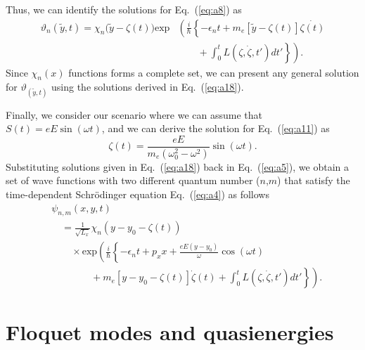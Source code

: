 \documentclass[
 reprint,
 amsmath,amssymb,
 aps,
 prb,
]{revtex4-2}
\begin{document}
Thus, we can identify the solutions for Eq.~(\ref{eq:a8}) as
\begin{equation} \label{eq:a18}
  \begin{aligned}
    \vartheta_n(\tilde{y},t) = \chi_n\bm{(}\tilde{y} - \zeta(t)\bm{)}
     \text{exp}&
     \left(
     \frac{i}{\hbar}
     \left\{
     - \epsilon_nt +
     m_e \left[\tilde{y}-\zeta(t)\right] \dot{\zeta(t)} \right. \right. \\
     & \left. \left. \qquad
     + \int_0^{t}L(\zeta,\dot{\zeta},t') dt'
     \right\}
     \right).
  \end{aligned}
\end{equation}
Since $\chi_n(x)$ functions forms a complete set, we can present any general solution for  $\vartheta_(\tilde{y},t)$ using the solutions derived in Eq.~(\ref{eq:a18}).

Finally, we consider our scenario where we can assume that $S(t) = eE\sin(\omega t)$, and we can derive the solution for Eq.~(\ref{eq:a11}) as
\begin{equation} \label{eq:a19}
  \zeta(t) = \frac{eE}{m_e(\omega_0^2 - \omega^2)}\sin(\omega t).
\end{equation}
Substituting solutions given in Eq.~(\ref{eq:a18}) back in Eq.~(\ref{eq:a5}), we obtain a set of wave functions with two different quantum number ($n$,$m$) that satisfy the time-dependent Schrödinger equation Eq.~(\ref{eq:a4}) as follows
\begin{equation} \label{eq:a20}
  \begin{aligned}
    &\psi_{n,m}(x,y,t) \\
    & \quad=  \frac{1}{\sqrt{L_x}}
    \chi_n\left(y - y_0 - \zeta(t)\right)\\
    &\qquad\times
    \text{exp}\left(
    \frac{i}{\hbar}
    \left\{- \epsilon_nt
    + p_x x
    + \frac{eE(y - y_0)}{\omega}\cos(\omega t) \right. \right. \\
    & \left. \left. \qquad\qquad +
    m_e\left[y - y_0 -\zeta(t)\right] \dot{\zeta}(t)+
    \int_0^{t}L(\zeta,\dot{\zeta},t') dt'
    \right\}
    \right).
  \end{aligned}
\end{equation}

\section{\label{appendix_b} Floquet modes and quasienergies}
\end{document}
